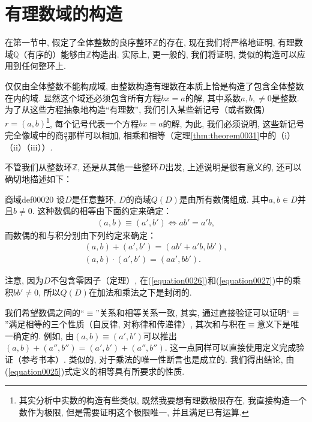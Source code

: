 \section{有理数域的构造}\label{section00202}
在第一节中, 假定了全体整数的良序整环$\mathbb{Z}$的存在, 现在我们将严格地证明, 有理数域$\mathbb{Q}$（有序的）能够由$\mathbb{Z}$构造出. 实际上, 更一般的, 我们将证明, 类似的构造可以应用到任何整环上. 

仅仅由全体整数不能构成域, 由整数构造有理数在本质上恰是构造了包含全体整数在内的域. 显然这个域还必须包含所有方程$bx=a$的解, 其中系数$a,b,\neq 0$是整数. 为了从这些方程抽象地构造“有理数”, 我们引入某些新记号（或者数偶）$r=(a,b)$\footnote{其实分析中实数的构造有些类似, 既然我要想有理数极限存在, 我直接构造一个数作为极限, 但是需要证明这个极限唯一, 并且满足已有运算. }, 每个记号代表一个方程$bx=a$的解, 为此, 我们必须说明, 这些新记号完全像域中的商$\frac{a}{b}$那样可以相加, 相乘和相等（定理\ref{thm:theorem0031}中的（i）（ii）（iii））. 

不管我们从整数环$\mathbb{Z}$, 还是从其他一些整环$D$出发, 上述说明是很有意义的, 还可以确切地描述如下：
\begin{definition}{商域}{def00020}
设$D$是任意整环, $D$的商域$Q(D)$是由所有数偶组成. 其中$a, b \in D$并且$b \neq 0$. 这种数偶的相等由下面约定来确定：
\begin{gather}\label{equation0025}
(a,b) \equiv (a',b') \Leftrightarrow ab'=a'b,
\end{gather}
而数偶的和与积分别由下列约定来确定：
\begin{gather}
(a,b) + (a', b') = (ab'+a'b, bb'),\label{equation0026}\\
(a, b) \cdot (a', b') = (aa', bb').\label{equation0027}
\end{gather}
\end{definition}

注意, 因为$D$不包含零因子（定理）, 在(\ref{equation0026})和(\ref{equation0027})中的乘积$bb' \neq 0$, 所以$Q(D)$在加法和乘法之下是封闭的. 

我们希望数偶之间的“$\equiv$”关系和相等关系一致, 其实, 通过直接验证可以证明“$\equiv$”满足相等的三个性质（自反律, 对称律和传递律）, 其次和与积在$\equiv$意义下是唯一确定的. 例如, 由$(a,b) \equiv (a', b')$可以推出$(a, b)+(a'', b'')=(a',b')+(a'', b'')$. 这一点同样可以直接使用定义完成验证（参考书本）. 类似的, 对于乘法的唯一性断言也是成立的. 我们得出结论, 由(\ref{equation0025})式定义的相等具有所要求的性质. 

